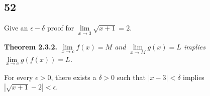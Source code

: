 \documentclass[../m134a-hw2.tex]{subfiles}
\begin{document}
\subsection*{52}
Give an $\epsilon-\delta$ proof for $\lim\limits_{x \to 3} \sqrt{x+1} = 2$.

\textbf{Theorem 2.3.2.}
\textit{$\lim\limits_{x \to c} f(x) = M$ and $\lim\limits_{x \to M} g(x) = L$ implies $\lim\limits_{x \to c} g(f(x)) = L$.}

\begin{proposition}
    For every $\epsilon > 0$, there exists a $\delta > 0$ such that $|x-3|<\delta$ implies $|\sqrt{x+1}-2|<\epsilon$.
\end{proposition}
\end{document}
